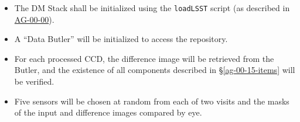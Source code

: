 \begin{itemize}

  \item{The DM Stack shall be initialized using the \texttt{loadLSST} script
  (as described in \hyperref[ag-00-00]{AG-00-00}).}

  \item{A ``Data Butler'' will be initialized to access the repository.}

  \item{For each processed CCD, the difference image 
	  will be retrieved from the Butler, and
  the existence of all components described in \S\ref{ag-00-15-items} will be
  verified.}

  \item{Five sensors will be chosen at random from each of two visits and the masks of the input and difference images compared by eye.}

\end{itemize}
